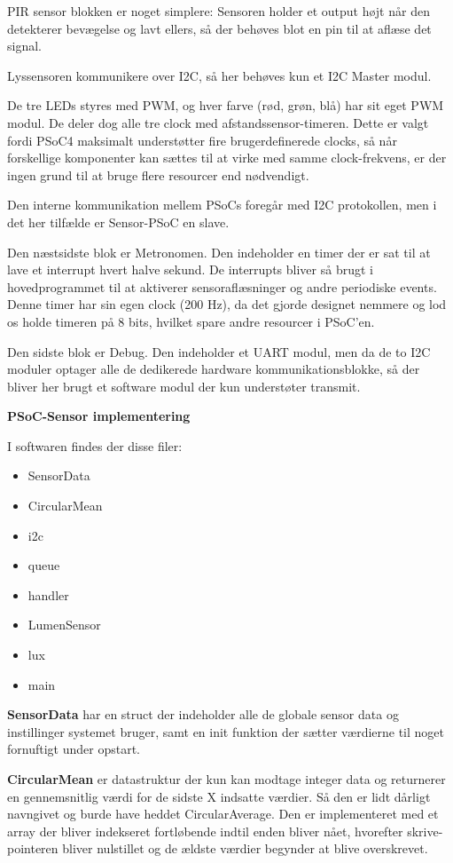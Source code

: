 PIR sensor blokken er noget simplere: Sensoren holder et output højt når den detekterer bevægelse og lavt ellers, så der behøves blot en pin til at aflæse det signal.

Lyssensoren kommunikere over I2C, så her behøves kun et I2C Master modul.

De tre LEDs styres med PWM, og hver farve (rød, grøn, blå) har sit eget PWM modul. De deler dog alle tre clock med afstandssensor-timeren. Dette er valgt fordi PSoC4 maksimalt understøtter fire brugerdefinerede clocks, så når forskellige komponenter kan sættes til at virke med samme clock-frekvens, er der ingen grund til at bruge flere resourcer end nødvendigt.

Den interne kommunikation mellem PSoCs foregår med I2C protokollen, men i det her tilfælde er Sensor-PSoC en slave.

Den næstsidste blok er Metronomen. Den indeholder en timer der er sat til at lave et interrupt hvert halve sekund. De interrupts bliver så brugt i hovedprogrammet til at aktiverer sensoraflæsninger og andre periodiske events. Denne timer har sin egen clock (200 Hz), da det gjorde designet nemmere og lod os holde timeren på 8 bits, hvilket spare andre resourcer i PSoC'en.

Den sidste blok er Debug. Den indeholder et UART modul, men da de to I2C moduler optager alle de dedikerede hardware kommunikationsblokke, så der bliver her brugt et software modul der kun understøter transmit.

{\centering\textbf{PSoC-Sensor implementering}\par}

I softwaren findes der disse filer:
\begin{itemize}
	\item SensorData
	\item CircularMean
	\item i2c
	\item queue
	\item handler
	\item LumenSensor
	\item lux
	\item main
\end{itemize}

\textbf{SensorData} har en struct der indeholder alle de globale sensor data og instillinger systemet bruger, samt en init funktion der sætter værdierne til noget fornuftigt under opstart.

\textbf{CircularMean} er datastruktur der kun kan modtage integer data og returnerer en gennemsnitlig værdi for de sidste X indsatte værdier. Så den er lidt dårligt navngivet og burde have heddet CircularAverage. Den er implementeret med et array der bliver indekseret fortløbende indtil enden bliver nået, hvorefter skrive-pointeren bliver nulstillet og de ældste værdier begynder at blive overskrevet.

